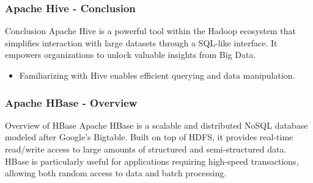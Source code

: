 \documentclass[aspectratio=169]{beamer}
\begin{document}
\begin{frame}[fragile]
    \frametitle{Apache Hive - Conclusion}
    \begin{block}{Conclusion}
        Apache Hive is a powerful tool within the Hadoop ecosystem that simplifies interaction with large datasets through a SQL-like interface. It empowers organizations to unlock valuable insights from Big Data.
        \begin{itemize}
            \item Familiarizing with Hive enables efficient querying and data manipulation.
        \end{itemize}
    \end{block}
\end{frame}

\begin{frame}[fragile]
    \frametitle{Apache HBase - Overview}
    \begin{block}{Overview of HBase}
        Apache HBase is a scalable and distributed NoSQL database modeled after Google's Bigtable. 
        Built on top of HDFS, it provides real-time read/write access to large amounts of structured and semi-structured data.
        HBase is particularly useful for applications requiring high-speed transactions, 
        allowing both random access to data and batch processing.
    \end{block}
\end{frame}
\end{document}
